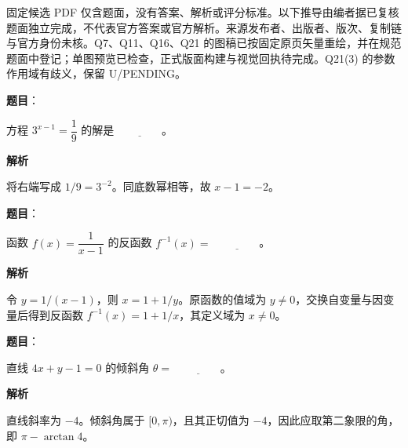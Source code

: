 

\begin{gktip}
固定候选 PDF 仅含题面，没有答案、解析或评分标准。以下推导由编者据已复核题面独立完成，不代表官方答案或官方解析。来源发布者、出版者、版次、复制链与官方身份未核。Q7、Q11、Q16、Q21 的图稿已按固定原页矢量重绘，并在规范题面中登记；单图预览已检查，正式版面构建与视觉回执待完成。Q21(3) 的参数作用域有歧义，保留 U/PENDING。
\end{gktip}

\begin{answer}

\textbf{题目}：

方程 $3^{x-1}=\dfrac{1}{9}$ 的解是 $\underline{\qquad\qquad}$。

\textbf{解析}

将右端写成 $1/9=3^{-2}$。同底数幂相等，故 $x-1=-2$。


\end{answer}
\begin{answer}

\textbf{题目}：

函数 $f(x)=\dfrac{1}{x-1}$ 的反函数 $f^{-1}(x)=$ $\underline{\qquad\qquad}$。

\textbf{解析}

令 $y=1/(x-1)$，则 $x=1+1/y$。原函数的值域为 $y\ne0$，交换自变量与因变量后得到反函数 $f^{-1}(x)=1+1/x$，其定义域为 $x\ne0$。


\end{answer}
\begin{answer}

\textbf{题目}：

直线 $4x+y-1=0$ 的倾斜角 $\theta=$ $\underline{\qquad\qquad}$。

\textbf{解析}

直线斜率为 $-4$。倾斜角属于 $[0,\pi)$，且其正切值为 $-4$，因此应取第二象限的角，即 $\pi-\arctan4$。


\end{answer}
